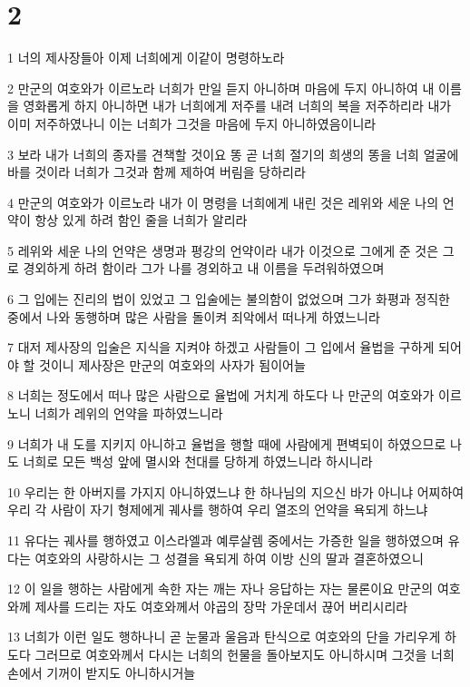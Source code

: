 \chapter{2}

\par 1 너의 제사장들아 이제 너희에게 이같이 명령하노라
\par 2 만군의 여호와가 이르노라 너희가 만일 듣지 아니하며 마음에 두지 아니하여 내 이름을 영화롭게 하지 아니하면 내가 너희에게 저주를 내려 너희의 복을 저주하리라 내가 이미 저주하였나니 이는 너희가 그것을 마음에 두지 아니하였음이니라
\par 3 보라 내가 너희의 종자를 견책할 것이요 똥 곧 너희 절기의 희생의 똥을 너희 얼굴에 바를 것이라 너희가 그것과 함께 제하여 버림을 당하리라
\par 4 만군의 여호와가 이르노라 내가 이 명령을 너희에게 내린 것은 레위와 세운 나의 언약이 항상 있게 하려 함인 줄을 너희가 알리라
\par 5 레위와 세운 나의 언약은 생명과 평강의 언약이라 내가 이것으로 그에게 준 것은 그로 경외하게 하려 함이라 그가 나를 경외하고 내 이름을 두려워하였으며
\par 6 그 입에는 진리의 법이 있었고 그 입술에는 불의함이 없었으며 그가 화평과 정직한 중에서 나와 동행하며 많은 사람을 돌이켜 죄악에서 떠나게 하였느니라
\par 7 대저 제사장의 입술은 지식을 지켜야 하겠고 사람들이 그 입에서 율법을 구하게 되어야 할 것이니 제사장은 만군의 여호와의 사자가 됨이어늘
\par 8 너희는 정도에서 떠나 많은 사람으로 율법에 거치게 하도다 나 만군의 여호와가 이르노니 너희가 레위의 언약을 파하였느니라
\par 9 너희가 내 도를 지키지 아니하고 율법을 행할 때에 사람에게 편벽되이 하였으므로 나도 너희로 모든 백성 앞에 멸시와 천대를 당하게 하였느니라 하시니라
\par 10 우리는 한 아버지를 가지지 아니하였느냐 한 하나님의 지으신 바가 아니냐 어찌하여 우리 각 사람이 자기 형제에게 궤사를 행하여 우리 열조의 언약을 욕되게 하느냐
\par 11 유다는 궤사를 행하였고 이스라엘과 예루살렘 중에서는 가증한 일을 행하였으며 유다는 여호와의 사랑하시는 그 성결을 욕되게 하여 이방 신의 딸과 결혼하였으니
\par 12 이 일을 행하는 사람에게 속한 자는 깨는 자나 응답하는 자는 물론이요 만군의 여호와께 제사를 드리는 자도 여호와께서 야곱의 장막 가운데서 끊어 버리시리라
\par 13 너희가 이런 일도 행하나니 곧 눈물과 울음과 탄식으로 여호와의 단을 가리우게 하도다 그러므로 여호와께서 다시는 너희의 헌물을 돌아보지도 아니하시며 그것을 너희 손에서 기꺼이 받지도 아니하시거늘
